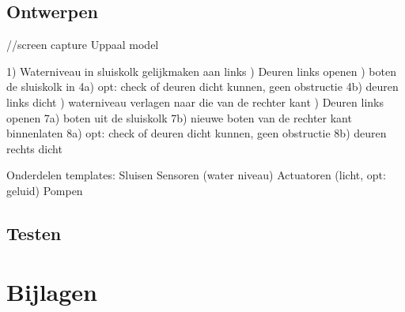 \documentclass{article}
\begin{document}
\subsection{Ontwerpen}
//screen capture Uppaal model \newline

1) Waterniveau in sluiskolk gelijkmaken aan links ) Deuren links openen ) boten de sluiskolk in \newline
4a) opt: check of deuren dicht kunnen, geen obstructie \newline
4b) deuren links dicht ) waterniveau verlagen naar die van de rechter kant ) Deuren links openen \newline
7a) boten uit de sluiskolk \newline
7b) nieuwe boten van de rechter kant binnenlaten \newline
8a) opt: check of deuren dicht kunnen, geen obstructie \newline
8b) deuren rechts dicht \newline

Onderdelen templates: \newline
Sluisen \newline
Sensoren (water niveau) \newline
Actuatoren (licht, opt: geluid) \newline
Pompen


\subsection{Testen}

\section{Bijlagen}
\newpage


\end{document}
